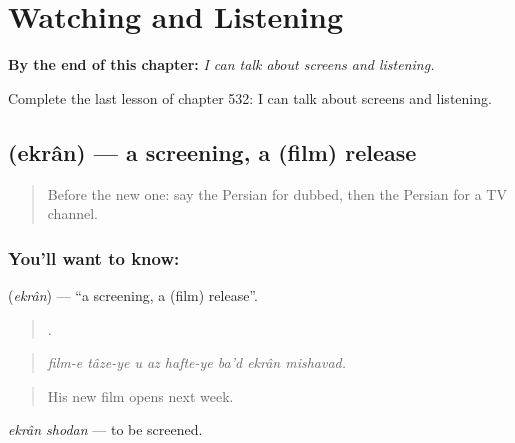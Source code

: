 
\chapter{Watching and Listening}
\label{ch:fa-watching-and-listening}

\begin{chapteropening}
\textbf{By the end of this chapter:} \emph{I can talk about screens and listening.}

Complete the last lesson of chapter 532: I can talk about screens and listening.
\end{chapteropening}

\section[\texorpdfstring{\fa{اکران} (ekrân)}{اکران (ekrân)}]{ (ekrân) — a screening, a (film) release}

\label{lesson:FA-C532-ekran}



\begin{quote}
Before the new one: say the Persian for dubbed, then the Persian for a TV channel.
\end{quote}

\subsection*{You'll want to know: }
\textbf{} (\emph{ekrân}) — \textquotedblleft{}a screening, a (film) release\textquotedblright{}.

\begin{quote}
       .
\end{quote}

\begin{quote}
\emph{film-e tâze-ye u az hafte-ye ba'd ekrân mishavad.}
\end{quote}

\begin{quote}
His new film opens next week.
\end{quote}

\emph{ekrân shodan} — to be screened.

